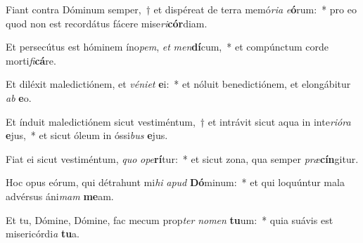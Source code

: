 \item Fiant contra Dóminum semper,~† et dispéreat de terra memó\textit{ri}\textit{a} \textit{e}\textbf{ó}rum:~* pro eo quod non est recordátus fácere mise\textit{ri}\textbf{cór}diam.
\item Et persecútus est hóminem íno\textit{pem}, \textit{et} \textit{men}\textbf{dí}cum,~* et compúnctum corde morti\textit{fi}\textbf{cá}re.
\item Et diléxit maledictiónem, et \textit{vé}\textit{ni}\textit{et} \textbf{e}i:~* et nóluit benedictiónem, et elongábitur \textit{ab} \textbf{e}o.
\item Et índuit maledictiónem sicut vestiméntum,~† et intrávit sicut aqua in inte\textit{ri}\textit{ó}\textit{ra} \textbf{e}jus,~* et sicut óleum in óssi\textit{bus} \textbf{e}jus.
\item Fiat ei sicut vestiméntum, \textit{quo} \textit{o}\textit{pe}\textbf{rí}tur:~* et sicut zona, qua semper \textit{præ}\textbf{cín}gitur.
\item Hoc opus eórum, qui détrahunt mi\textit{hi} \textit{a}\textit{pud} \textbf{Dó}minum:~* et qui loquúntur mala advérsus áni\textit{mam} \textbf{me}am.
\item Et tu, Dómine, Dómine, fac mecum prop\textit{ter} \textit{no}\textit{men} \textbf{tu}um:~* quia suávis est misericórdi\textit{a} \textbf{tu}a.

